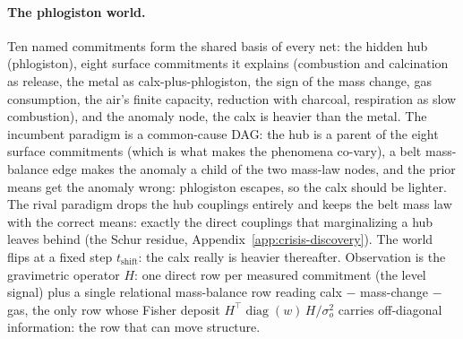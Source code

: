 \documentclass[runningheads]{llncs}
\begin{document}
\paragraph{The phlogiston world.}
Ten named commitments form the shared basis of every net: the hidden hub
(phlogiston), eight surface commitments it explains (combustion and calcination as
release, the metal as calx-plus-phlogiston, the sign of the mass change, gas consumption,
the air's finite capacity, reduction with charcoal, respiration as slow combustion), and the
anomaly node, the calx is heavier than the metal. The incumbent paradigm is a
common-cause DAG: the hub is a parent of the eight surface commitments (which is what makes
the phenomena co-vary), a belt mass-balance edge makes the anomaly a child of the two
mass-law nodes, and the prior means get the anomaly wrong: phlogiston escapes, so
the calx should be lighter. The rival paradigm drops the hub couplings entirely and keeps
the belt mass law with the correct means: exactly the direct couplings that
marginalizing a hub leaves behind (the Schur residue,
Appendix~\ref{app:crisis-discovery}). The world flips at a fixed step
$t_{\text{shift}}$: the calx really is heavier thereafter. Observation is the gravimetric
operator $H$: one direct row per measured commitment (the level signal) plus a single
relational mass-balance row reading calx $-$ mass-change $-$ gas, the only row whose Fisher
deposit $H^{\!\top}\!\operatorname{diag}(w)\,H/\sigma_o^2$ carries off-diagonal
information: the row that can move structure.
\end{document}
